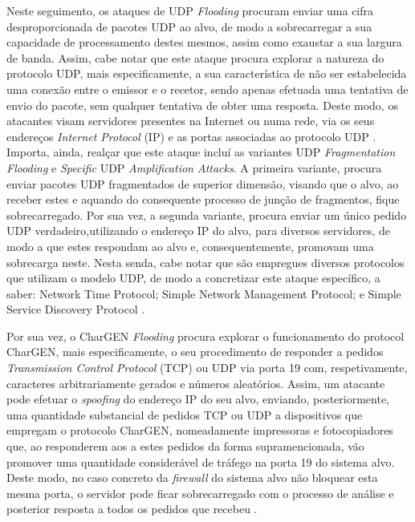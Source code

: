 Neste seguimento, os ataques de UDP \textit{Flooding} procuram enviar uma cifra desproporcionada de pacotes UDP ao alvo, de modo a sobrecarregar a sua capacidade de processamento destes mesmos, assim como exaustar a sua largura de banda. Assim, cabe notar que este ataque procura explorar a natureza do protocolo UDP, mais especificamente, a sua característica de não ser estabelecida uma conexão entre o emissor e o recetor, sendo apenas efetuada uma tentativa de envio do pacote, sem qualquer tentativa de obter uma resposta. Deste modo, os atacantes visam servidores presentes na Internet ou numa rede, via os seus endereços \textit{Internet Protocol} (IP) e as portas associadas ao protocolo UDP \cite{esecurityplanet_types_of_ddos_attacks}. Importa, ainda, realçar que este ataque incluí as variantes UDP \textit{Fragmentation Flooding} e \textit{Specific} UDP \textit{Amplification Attacks}. A primeira variante, procura enviar pacotes UDP fragmentados de superior dimensão, visando que o alvo, ao receber estes e aquando do consequente processo de junção de fragmentos, fique sobrecarregado. Por sua vez, a segunda variante, procura enviar um único pedido UDP verdadeiro,utilizando o endereço IP do alvo, para diversos servidores, de modo a que estes respondam ao alvo e, consequentemente, promovam uma sobrecarga neste. Nesta senda, cabe notar que são empregues diversos protocolos que utilizam o modelo UDP, de modo a concretizar este ataque específico, a saber: Network Time Protocol; Simple Network Management Protocol; e Simple Service Discovery Protocol \cite{esecurityplanet_types_of_ddos_attacks}.

Por sua vez, o CharGEN \textit{Flooding} procura explorar o funcionamento do protocol CharGEN, mais especificamente, o seu procedimento de responder a pedidos \textit{Transmission Control Protocol} (TCP) ou UDP via porta 19 com, respetivamente, caracteres arbitrariamente gerados e números aleatórios. Assim, um atacante pode efetuar o \textit{spoofing} do endereço IP do seu alvo, enviando, posteriormente, uma quantidade substancial de pedidos TCP ou UDP a dispositivos que empregam o protocolo CharGEN, nomeadamente impressoras e fotocopiadores que, ao responderem aos a estes pedidos da forma supramencionada, vão promover uma quantidade considerável de tráfego na porta 19 do sistema alvo. Deste modo, no caso concreto da \textit{firewall} do sistema alvo não bloquear esta mesma porta, o servidor pode ficar sobrecarregado com o processo de análise e posterior resposta a todos os pedidos que recebeu \cite{esecurityplanet_types_of_ddos_attacks,connectwise_types_of_ddos_attacks}.


